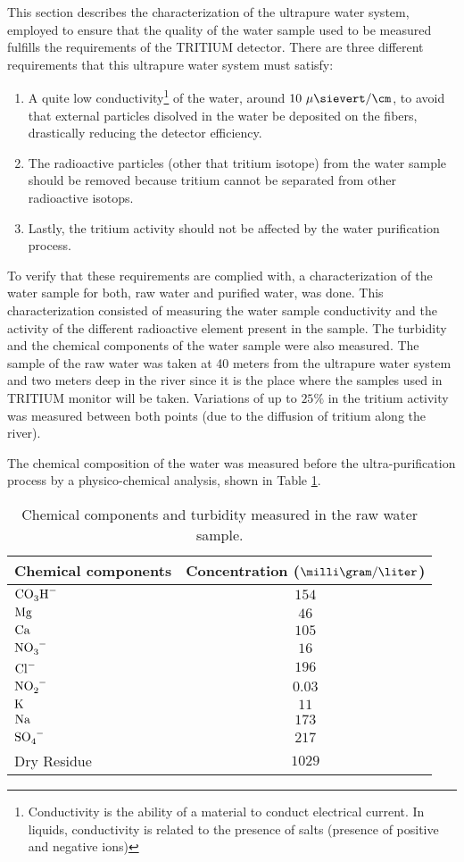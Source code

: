 This section describes the characterization of the ultrapure water system, employed to ensure that the quality of the water sample used to be measured fulfills the requirements of the TRITIUM detector. There are three different requirements that this ultrapure water system must satisfy:

\begin{enumerate}
\item{} A quite low conductivity\footnote{Conductivity is the ability of a material to conduct electrical current. In liquids, conductivity is related to the presence of salts (presence of positive and negative ions)} of the water, around $10~\mu\sievert/\cm$, to avoid that external particles disolved in the water be deposited on the fibers, drastically reducing the detector efficiency.

\item{} The radioactive particles (other that tritium isotope) from the water sample should be removed because tritium cannot be separated from other radioactive isotops.

\item{} Lastly, the tritium activity should not be affected by the water purification process. 

\end{enumerate}

To verify that these requirements are complied with, a characterization of the water sample for both, raw water and purified water, was done. This characterization consisted of measuring the water sample conductivity and the activity of the different radioactive element present in the sample. The turbidity and the chemical components of the water sample were also measured. The sample of the raw water was taken at 40 meters from the ultrapure water system and two meters deep in the river since it is the place where the samples used in TRITIUM monitor will be taken. Variations of up to $25\%$ in the tritium activity was measured between both points (due to the diffusion of tritium along the river).

The chemical composition of the water was measured before the ultra-purification process by a physico-chemical analysis, shown in Table \ref{tab:ChemicalComponentsRawWater}.

\begin{table}[htbp]
\centering{}%
\begin{tabular}{lc}
\toprule 
Chemical components & Concentration ($\milli\gram/\liter$) \tabularnewline
\midrule
\midrule 
$\ce{CO_{3}H^-}$ & $154$ \tabularnewline
$\ce{Mg}$ & $46$ \tabularnewline
$\ce{Ca}$ & $105$ \tabularnewline
$\ce{NO_{3}^-}$ & $16$ \tabularnewline
$\ce{Cl^-}$ & $196$ \tabularnewline
$\ce{NO_{2}^-}$ & $0.03$ \tabularnewline
$\ce{K}$ & $11$ \tabularnewline
$\ce{Na}$ & $173$ \tabularnewline
$\ce{SO_{4}^-}$ & $217$ \tabularnewline
Dry Residue & $1029$ \tabularnewline
\bottomrule
\end{tabular}
\caption{Chemical components and turbidity measured in the raw water sample.}
\label{tab:ChemicalComponentsRawWater}
\end{table}

